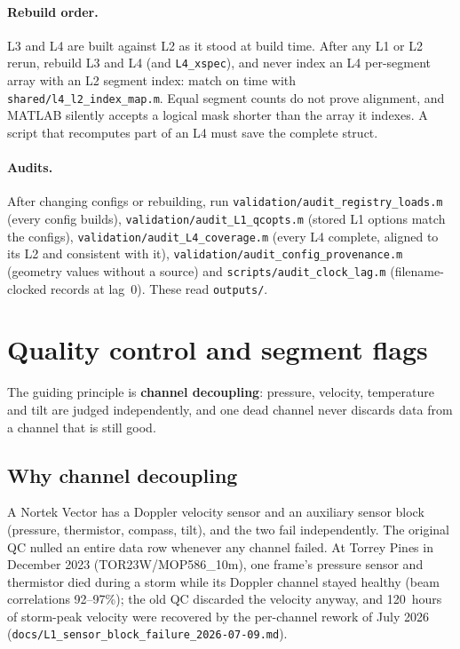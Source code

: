 \documentclass[11pt]{article}
\newcommand{\code}[1]{\texttt{#1}}
\begin{document}
\paragraph{Rebuild order.} L3 and L4 are built against L2 as it stood at build time. After any
L1 or L2 rerun, rebuild L3 and L4 (and \code{L4\_xspec}), and never index an L4 per-segment
array with an L2 segment index: match on time with \code{shared/l4\_l2\_index\_map.m}. Equal
segment counts do not prove alignment, and MATLAB silently accepts a logical mask shorter than
the array it indexes. A script that recomputes part of an L4 must save the complete struct.

\paragraph{Audits.} After changing configs or rebuilding, run
\code{validation/audit\_registry\_loads.m} (every config builds),
\code{validation/audit\_L1\_qcopts.m} (stored L1 options match the configs),
\code{validation/audit\_L4\_coverage.m} (every L4 complete, aligned to its L2 and consistent
with it), \code{validation/audit\_config\_provenance.m} (geometry values without a source) and
\code{scripts/audit\_clock\_lag.m} (filename-clocked records at lag~0). These read \code{outputs/}.

\section{Quality control and segment flags}
\label{sec:qc}

The guiding principle is \textbf{channel decoupling}: pressure, velocity, temperature and tilt
are judged independently, and one dead channel never discards data from a channel that is
still good.

\subsection{Why channel decoupling}

A Nortek Vector has a Doppler velocity sensor and an auxiliary sensor block (pressure,
thermistor, compass, tilt), and the two fail independently. The original QC nulled an entire
data row whenever any channel failed. At Torrey Pines in December 2023 (TOR23W/MOP586\_10m), one
frame's pressure sensor and thermistor died during a storm while its Doppler channel stayed
healthy (beam correlations 92--97\%); the old QC discarded the velocity anyway, and 120~hours
of storm-peak velocity were recovered by the per-channel rework of July 2026
(\code{docs/L1\_sensor\_block\_failure\_2026-07-09.md}).
\end{document}
